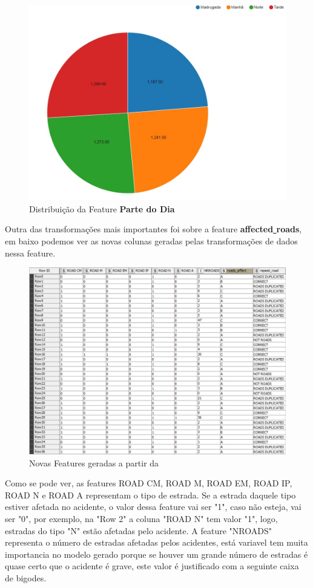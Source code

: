 \documentclass[a4paper,10pt]{article}
\begin{document}
\begin{figure} [ h! ]
 \centering
  \includegraphics[width=0.9\linewidth,scale=1.2]{imagens/partedodiafreq.jpg}
  \caption{Distribuição da Feature \textbf{Parte do Dia}}
  \label{fig:partedodiafreq}
\end{figure}

Outra das transformações mais importantes foi sobre a feature \textbf{affected\underline{ }roads}, em baixo podemos ver as novas colunas geradas pelas transformações de dados nessa feature. 

\begin{figure} [ h! ]
  \centering
  \includegraphics[width=0.9\linewidth,scale=1.2]{imagens/roads.jpg}
  \caption{Novas Features geradas a partir da }
  \label{fig:roads}
\end{figure}

Como se pode ver, as features ROAD CM, ROAD M, ROAD EM, ROAD IP, ROAD N e ROAD A representam o tipo de estrada. Se a estrada daquele tipo estiver afetada no acidente, o valor dessa feature vai ser "1", caso não esteja, vai ser "0", por exemplo, na "Row 2" a coluna "ROAD N" tem valor "1", logo, estradas do tipo "N" estão afetadas pelo acidente. 
A feature "NROADS" representa o número de estradas afetadas pelos acidentes, está variavel tem muita importancia no modelo gerado porque se houver um grande número de estradas é quase certo que o acidente é grave, este valor é justificado com a seguinte caixa de bigodes. 
\end{document}
